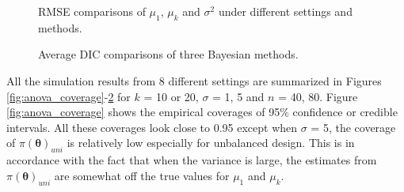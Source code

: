 \documentclass[Proceedings]{ascelike}
\begin{document}
\begin{figure}[h!]
\centering
{}
\caption{RMSE comparisons of $\mu_1$, $\mu_k$ and $\sigma^2$ under different settings and methods.}
\label{fig:anova_rmse}
\end{figure}
\begin{figure}[h!]
\centering
{}
\caption{Average DIC comparisons of three Bayesian methods.}
\label{fig:DIC_ano}
\end{figure}


All the simulation results from 8 different settings are summarized in
Figures \ref{fig:anova_coverage}-\ref{fig:DIC_ano} for $k$ = 10 or 20,
$\sigma$ = 1, 5 and $n$ = 40, 80. Figure \ref{fig:anova_coverage}
shows the empirical coverages of 95\% confidence or credible
intervals. All these coverages look close to 0.95 except when $\sigma$
= 5, the coverage of $\pi(\pmb\theta)_{uni}$ is relatively low
especially for unbalanced design. This is in accordance with the fact
that when the variance is large, the estimates from
$\pi(\pmb\theta)_{uni}$ are somewhat off the true values for $\mu_1$
and $\mu_k$.
\end{document}

